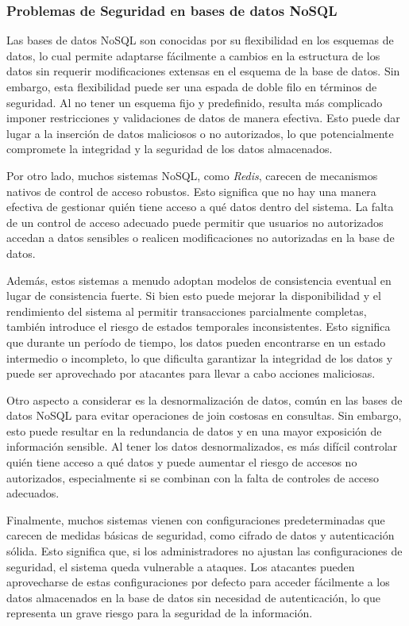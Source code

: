 \documentclass[pdflatex,sn-mathphys-num]{sn-jnl}
\theoremstyle{thmstyleone}%
\theoremstyle{thmstyletwo}%
\theoremstyle{thmstylethree}%
\begin{document}
\subsubsection{Problemas de Seguridad en bases de datos NoSQL}
Las bases de datos NoSQL son conocidas por su flexibilidad en los esquemas de datos, lo cual permite adaptarse fácilmente a cambios en la estructura de los datos sin requerir modificaciones extensas en el esquema de la base de datos. Sin embargo, esta flexibilidad puede ser una espada de doble filo en términos de seguridad. Al no tener un esquema fijo y predefinido, resulta más complicado imponer restricciones y validaciones de datos de manera efectiva. Esto puede dar lugar a la inserción de datos maliciosos o no autorizados, lo que potencialmente compromete la integridad y la seguridad de los datos almacenados.

Por otro lado, muchos sistemas NoSQL, como \textit{Redis}, carecen de mecanismos nativos de control de acceso robustos. Esto significa que no hay una manera efectiva de gestionar quién tiene acceso a qué datos dentro del sistema. La falta de un control de acceso adecuado puede permitir que usuarios no autorizados accedan a datos sensibles o realicen modificaciones no autorizadas en la base de datos.

Además, estos sistemas a menudo adoptan modelos de consistencia eventual en lugar de consistencia fuerte. Si bien esto puede mejorar la disponibilidad y el rendimiento del sistema al permitir transacciones parcialmente completas, también introduce el riesgo de estados temporales inconsistentes. Esto significa que durante un período de tiempo, los datos pueden encontrarse en un estado intermedio o incompleto, lo que dificulta garantizar la integridad de los datos y puede ser aprovechado por atacantes para llevar a cabo acciones maliciosas.

Otro aspecto a considerar es la desnormalización de datos, común en las bases de datos NoSQL para evitar operaciones de join costosas en consultas. Sin embargo, esto puede resultar en la redundancia de datos y en una mayor exposición de información sensible. Al tener los datos desnormalizados, es más difícil controlar quién tiene acceso a qué datos y puede aumentar el riesgo de accesos no autorizados, especialmente si se combinan con la falta de controles de acceso adecuados.

Finalmente, muchos sistemas vienen con configuraciones predeterminadas que carecen de medidas básicas de seguridad, como cifrado de datos y autenticación sólida. Esto significa que, si los administradores no ajustan las configuraciones de seguridad, el sistema queda vulnerable a ataques. Los atacantes pueden aprovecharse de estas configuraciones por defecto para acceder fácilmente a los datos almacenados en la base de datos sin necesidad de autenticación, lo que representa un grave riesgo para la seguridad de la información.
\end{document}
